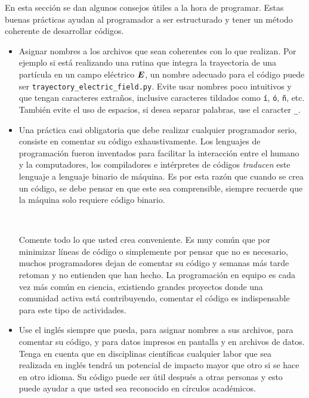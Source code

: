 En esta sección se dan algunos consejos útiles a la hora de programar. 
Estas buenas prácticas ayudan al programador a ser estructurado y tener 
un método coherente de desarrollar códigos.


\begin{itemize}
\item Asignar nombres a los archivos que sean coherentes con lo que realizan. 
Por ejemplo si está realizando una rutina que integra la trayectoria de una 
partícula en un campo eléctrico $\boldsymbol{ E }$, un nombre adecuado para el código
puede ser \texttt{trayectory\_electric\_field.py}. Evite usar nombres poco
intuitivos y que tengan caracteres extraños, inclusive caracteres tildados 
como \texttt{í}, \texttt{ó}, \texttt{ñ}, etc. También evite el uso de 
espacios, si desea separar palabras, use el caracter \texttt{\_}.

\item Una práctica casi obligatoria que debe realizar cualquier programador 
serio, consiste en comentar su código exhaustivamente. Los lenguajes de 
programación fueron inventados para facilitar la interacción entre el 
humano y la computadores, los compiladores e intérpretes de códigos 
\textit{traducen} este lenguaje a lenguaje binario de máquina. Es por esta 
razón que cuando se crea un código, se debe pensar en que este sea 
comprensible, siempre recuerde que la máquina solo requiere código binario.

\

Comente todo lo que usted crea conveniente. Es muy común que por minimizar 
líneas de código o simplemente por pensar que no es necesario, muchos 
programadores dejan de comentar su código y semanas más tarde retoman y no 
entienden que han hecho. La programación en equipo es cada vez más común 
en ciencia, existiendo grandes proyectos donde una comunidad activa está 
contribuyendo, comentar el código es indispensable para este tipo de 
actividades.

\item Use el inglés siempre que pueda, para asignar nombres a sus archivos, 
para comentar su código, y para datos impresos en pantalla y en archivos de 
datos. Tenga en cuenta que en disciplinas científicas cualquier labor que 
sea realizada en inglés tendrá un potencial de impacto mayor que otro si se 
hace en otro idioma. Su código puede ser útil después a otras personas y 
esto puede ayudar a que usted sea reconocido en círculos académicos.


\end{itemize}
